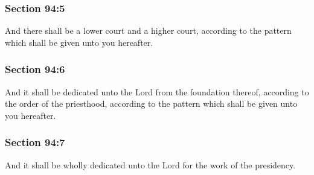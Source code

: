 	\subsubsection{Section 94:5} %
		\label{DC94-5}

		And there shall be a lower court and a higher court, according to the pattern which shall be given unto you hereafter.


	\subsubsection{Section 94:6} %
		\label{DC94-6}

		And it shall be dedicated unto the Lord from the foundation thereof, according to the order of the priesthood, according to the pattern which shall be given unto you hereafter.


	\subsubsection{Section 94:7} %
		\label{DC94-7}

		And it shall be wholly dedicated unto the Lord for the work of the presidency.


